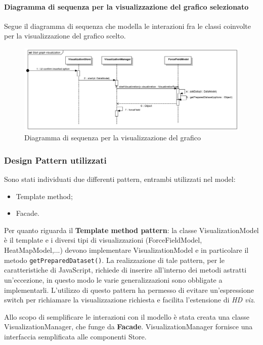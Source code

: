         \paragraph{Diagramma di sequenza per la visualizzazione del grafico selezionato}
        Segue il diagramma di sequenza che modella le interazioni fra le classi coinvolte per la visualizzazione del grafico scelto.
        \begin{figure}[H]
                \centering\includegraphics[width=1\textwidth]{source/img/sequenza5.jpeg}
                \caption{Diagramma di sequenza per la visualizzazione del grafico}
            \end{figure}
        
        
    \subsubsection{Design Pattern utilizzati}
        Sono stati individuati due differenti pattern, entrambi utilizzati nel model:
        \begin{itemize}
            \item Template method;
            \item Facade.
        \end{itemize}
        Per quanto riguarda il \textbf{Template method pattern}: la classe VisualizationModel è il template e i diversi tipi di visualizzazioni (ForceFieldModel, HeatMapModel,...) devono implementare VisualizationModel e in particolare il metodo \texttt{getPreparedDataset()}. La realizzazione di tale pattern, per le caratteristiche di JavaScript, richiede di inserire all'interno dei metodi astratti un'eccezione, in questo modo le varie generalizzazioni sono obbligate a implementarli. L'utilizzo di questo pattern ha permesso di evitare un'espressione switch per richiamare la visualizzazione richiesta e facilita l'estensione di \emph{HD viz}.
        
        Allo scopo di semplificare le interazioni con il modello è stata creata una classe VisualizationManager, che funge da \textbf{Facade}. VisualizationManager fornisce una interfaccia semplificata alle componenti Store.
        
